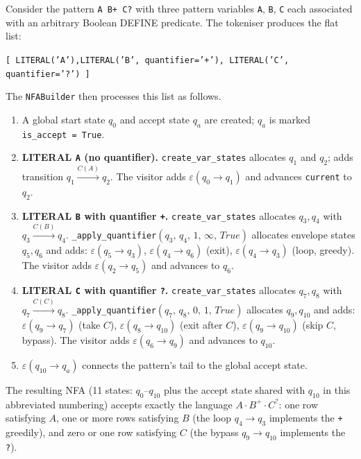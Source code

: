 Consider the pattern \texttt{A B+ C?} with three pattern variables
\texttt{A}, \texttt{B}, \texttt{C} each associated with an
arbitrary Boolean DEFINE predicate.  The tokeniser produces the
flat list:
\begin{center}
  \texttt{[\,LITERAL('A'),\quad LITERAL('B', quantifier='+'),\quad
    LITERAL('C', quantifier='?')\,]}
\end{center}
The \texttt{NFABuilder} then processes this list as follows.

\begin{enumerate}
  \item A global start state $q_0$ and accept state $q_a$ are
    created; $q_a$ is marked \texttt{is\_accept = True}.

  \item \textbf{LITERAL \texttt{A} (no quantifier).}
    \texttt{create\_var\_states} allocates $q_1$ and $q_2$; adds
    transition $q_1 \xrightarrow{C(A)} q_2$.
    The visitor adds $\varepsilon(q_0 \to q_1)$ and advances
    \texttt{current} to $q_2$.

  \item \textbf{LITERAL \texttt{B} with quantifier \texttt{+}.}
    \texttt{create\_var\_states} allocates $q_3, q_4$ with
    $q_3 \xrightarrow{C(B)} q_4$.
    \texttt{\_apply\_quantifier}$(q_3,\,q_4,\,1,\,\infty,\,\mathit{True})$
    allocates envelope states $q_5, q_6$ and adds:
    $\varepsilon(q_5 \to q_3)$,\;
    $\varepsilon(q_4 \to q_6)$ (exit),\;
    $\varepsilon(q_4 \to q_3)$ (loop, greedy).
    The visitor adds $\varepsilon(q_2 \to q_5)$ and advances to $q_6$.

  \item \textbf{LITERAL \texttt{C} with quantifier \texttt{?}.}
    \texttt{create\_var\_states} allocates $q_7, q_8$ with
    $q_7 \xrightarrow{C(C)} q_8$.
    \texttt{\_apply\_quantifier}$(q_7,\,q_8,\,0,\,1,\,\mathit{True})$
    allocates $q_9, q_{10}$ and adds:
    $\varepsilon(q_9 \to q_7)$ (take $C$),\;
    $\varepsilon(q_8 \to q_{10})$ (exit after $C$),\;
    $\varepsilon(q_9 \to q_{10})$ (skip $C$, bypass).
    The visitor adds $\varepsilon(q_6 \to q_9)$ and advances to $q_{10}$.

  \item $\varepsilon(q_{10} \to q_a)$ connects the pattern's tail
    to the global accept state.
\end{enumerate}

\noindent
The resulting NFA (11 states: $q_0$–$q_{10}$ plus the accept state
shared with $q_{10}$ in this abbreviated numbering) accepts exactly
the language $A \cdot B^{+} \cdot C^{?}$: one row satisfying $A$,
one or more rows satisfying $B$ (the loop $q_4 \to q_3$ implements
the \texttt{+} greedily), and zero or one row satisfying $C$ (the
bypass $q_9 \to q_{10}$ implements the \texttt{?}).

